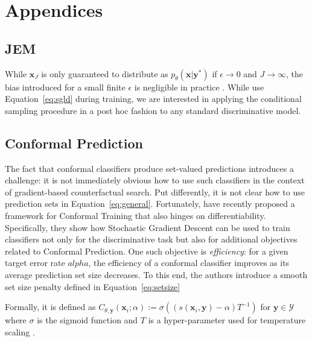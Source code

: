 \documentclass{article}
\begin{document}
\medskip



\appendix
\section*{Appendices}
\renewcommand{\thesubsection}{\Alph{subsection}}

\subsection{JEM}\label{app-jem}

While $\mathbf{x}_J$ is only guaranteed to distribute as $p_{\theta}(\mathbf{x}|\mathbf{y}^*)$ if $\epsilon \rightarrow 0$ and $J \rightarrow \infty$, the bias introduced for a small finite $\epsilon$ is negligible in practice \citep{murphy2023probabilistic,grathwohl2020your}. While \citet{grathwohl2020your} use Equation~\ref{eq:sgld} during training, we are interested in applying the conditional sampling procedure in a post hoc fashion to any standard discriminative model. 

\subsection{Conformal Prediction}\label{app-cp}

The fact that conformal classifiers produce set-valued predictions introduces a challenge: it is not immediately obvious how to use such classifiers in the context of gradient-based counterfactual search. Put differently, it is not clear how to use prediction sets in Equation~\ref{eq:general}. Fortunately, \citet{stutz2022learning} have recently proposed a framework for Conformal Training that also hinges on differentiability. Specifically, they show how Stochastic Gradient Descent can be used to train classifiers not only for the discriminative task but also for additional objectives related to Conformal Prediction. One such objective is \textit{efficiency}: for a given target error rate $alpha$, the efficiency of a conformal classifier improves as its average prediction set size decreases. To this end, the authors introduce a smooth set size penalty defined in Equation~\ref{eq:setsize}

Formally, it is defined as $C_{\theta,\mathbf{y}}(\mathbf{x}_i;\alpha):=\sigma\left((s(\mathbf{x}_i,\mathbf{y})-\alpha) T^{-1}\right)$ for $\mathbf{y}\in\mathcal{Y}$ where $\sigma$ is the sigmoid function and $T$ is a hyper-parameter used for temperature scaling \citep{stutz2022learning}.
\end{document}
